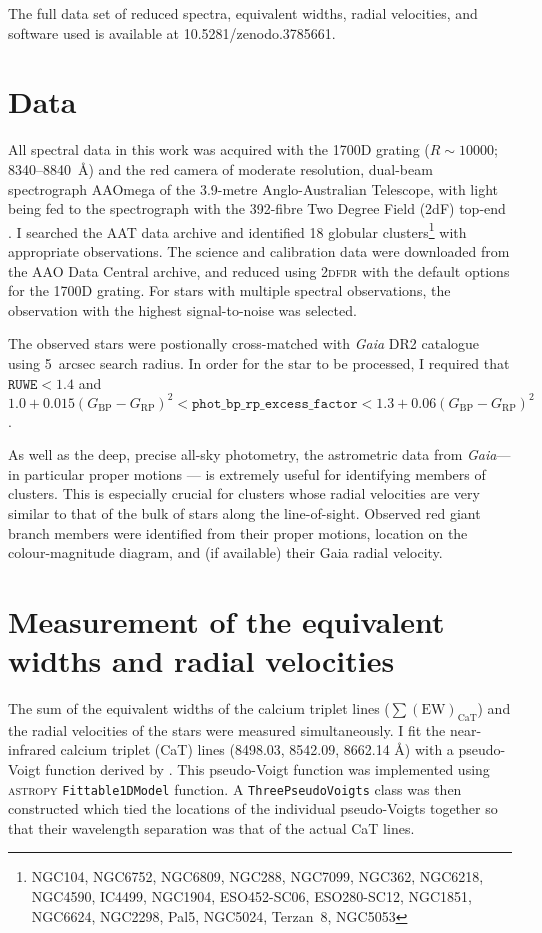 \documentclass[RNAAS]{aastex63}
\newcommand{\bprp}{\ensuremath{G_\textrm{BP}-G_\textrm{RP}}}
\newcommand{\sumcat}{\ensuremath{\sum{(\mathrm{EW})_\mathrm{CaT}}}\xspace}
\newcommand{\gaia}{\textit{Gaia}\xspace}
\begin{document}
The full data set of reduced spectra, equivalent widths, radial velocities, and software used is available at 10.5281/zenodo.3785661.


\section{Data}
All spectral data in this work was acquired with the 1700D grating ($R\sim10000$; 8340--8840~\AA) and the red camera of moderate resolution, dual-beam spectrograph AAOmega \citep{Sharp2006} of the 3.9-metre Anglo-Australian Telescope, with light being fed to the spectrograph with the 392-fibre Two Degree Field (2dF) top-end \citep{Lewis2002}. I searched the AAT data archive and identified 18 globular clusters\footnote{NGC104, NGC6752, NGC6809, NGC288, NGC7099, NGC362, NGC6218, NGC4590, IC4499, NGC1904, ESO452-SC06, ESO280-SC12, NGC1851, NGC6624, NGC2298, Pal5, NGC5024, Terzan~8, NGC5053} with appropriate observations. The science and calibration data were downloaded from the AAO Data Central archive, and reduced using \textsc{2dfdr} \citep{AAOSoftwareTeam2015} with the default options for the 1700D grating. For stars with multiple spectral observations, the observation with the highest signal-to-noise was selected.

The observed stars were postionally cross-matched with \gaia DR2 catalogue \citep{GaiaCollaboration2016,GaiaCollaboration2018a} using 5~arcsec search radius. In order for the star to be processed, I required that $\texttt{RUWE}<1.4$ \citep{Lindegren2018a} and $1.0+0.015(\bprp)^2 < \mathrm{\texttt{phot\_bp\_rp\_excess\_factor}} <1.3+0.06(\bprp)^2$ \citep{Evans2018a}.

As well as the deep, precise all-sky photometry, the astrometric data from \gaia --- in particular proper motions --- is extremely useful for identifying members of clusters. This is especially crucial for clusters whose radial velocities are very similar to that of the bulk of stars along the line-of-sight. Observed red giant branch members were identified from their proper motions, location on the colour-magnitude diagram, and (if available) their Gaia radial velocity. 

\section{Measurement of the equivalent widths and radial velocities}
The sum of the equivalent widths of the calcium triplet lines (\sumcat) and the radial velocities of the stars were measured simultaneously. I fit the near-infrared calcium triplet (CaT) lines (8498.03, 8542.09, 8662.14 \AA) with a pseudo-Voigt function derived by \citet{Thompson1987}.
This pseudo-Voigt function was implemented using \textsc{astropy} \texttt{Fittable1DModel} function. A \texttt{ThreePseudoVoigts} class was then constructed which tied the locations of the individual pseudo-Voigts together so that their wavelength separation was that of the actual CaT lines.
\end{document}
